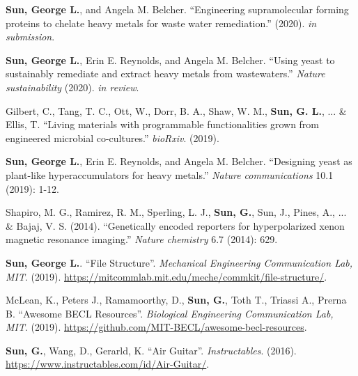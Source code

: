 

\begin{cvparagraph}
\textbf{Sun, George L.}, and Angela M. Belcher. ``Engineering supramolecular forming proteins to chelate heavy metals for waste water remediation.'' (2020). \textit{in submission}.

\textbf{Sun, George L.}, Erin E. Reynolds, and Angela M. Belcher. ``Using yeast to sustainably remediate and extract heavy metals from wastewaters.'' \textit{Nature sustainability} (2020). \textit{in review}.

Gilbert, C., Tang, T. C., Ott, W., Dorr, B. A., Shaw, W. M., \textbf{Sun, G. L.}, ... \& Ellis, T. ``Living materials with programmable functionalities grown from engineered microbial co-cultures.'' \textit{bioRxiv}. (2019).

\textbf{Sun, George L.}, Erin E. Reynolds, and Angela M. Belcher. ``Designing yeast as plant-like hyperaccumulators for heavy metals.'' \textit{Nature communications} 10.1 (2019): 1-12.

Shapiro, M. G., Ramirez, R. M., Sperling, L. J., \textbf{Sun, G.}, Sun, J., Pines, A., ... \& Bajaj, V. S. (2014). ``Genetically encoded reporters for hyperpolarized xenon magnetic resonance imaging.'' \textit{Nature chemistry} 6.7 (2014): 629.

\end{cvparagraph}


\begin{cvparagraph}
\textbf{Sun, George L.}. ``File Structure''. \textit{Mechanical Engineering Communication Lab, MIT}. (2019). \url{https://mitcommlab.mit.edu/meche/commkit/file-structure/}.

McLean, K., Peters J., Ramamoorthy, D., \textbf{Sun, G.}, Toth T., Triassi A., Prerna B. ``Awesome BECL Resources''. \textit{Biological Engineering Communication Lab, MIT}. (2019). \url{https://github.com/MIT-BECL/awesome-becl-resources}.

\textbf{Sun, G.}, Wang, D., Gerarld, K. ``Air Guitar''. \textit{Instructables}. (2016). \url{
https://www.instructables.com/id/Air-Guitar/}.

\end{cvparagraph}
